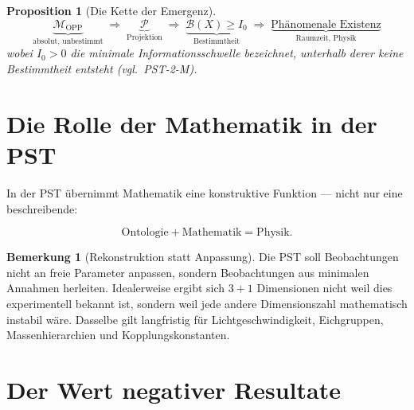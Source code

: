 \documentclass[11pt,a4paper]{article}
\theoremstyle{plain}
\newtheorem{proposition}{Proposition}[section]
\theoremstyle{definition}
\newtheorem{remark}{Bemerkung}[section]
\begin{document}
\begin{proposition}[Die Kette der Emergenz]
\[
  \underbrace{\mathcal{M}_{\text{OPP}}}_{\text{absolut, unbestimmt}}
  \;\Longrightarrow\;
  \underbrace{\mathcal{P}}_{\text{Projektion}}
  \;\Longrightarrow\;
  \underbrace{\mathcal{B}(X) \geq I_0}_{\text{Bestimmtheit}}
  \;\Longrightarrow\;
  \underbrace{\text{Ph\"{a}nomenale Existenz}}_{\text{Raumzeit, Physik}}
\]
wobei $I_0 > 0$ die minimale Informationsschwelle bezeichnet, unterhalb
derer keine Bestimmtheit entsteht (vgl.\ PST-2-M).
\end{proposition}

\section{Die Rolle der Mathematik in der PST}

In der PST \"{u}bernimmt Mathematik eine konstruktive Funktion --- nicht
nur eine beschreibende:

\[
  \boxed{
    \text{Ontologie} + \text{Mathematik} = \text{Physik.}
  }
\]

\begin{remark}[Rekonstruktion statt Anpassung]
Die PST soll Beobachtungen nicht an freie Parameter anpassen, sondern
Beobachtungen aus minimalen Annahmen herleiten. Idealerweise ergibt sich
$3+1$ Dimensionen nicht weil dies experimentell bekannt ist, sondern weil
jede andere Dimensionszahl mathematisch instabil w\"{a}re. Dasselbe gilt
langfristig f\"{u}r Lichtgeschwindigkeit, Eichgruppen,
Massenhierarchien und Kopplungskonstanten.
\end{remark}

\section{Der Wert negativer Resultate}
\end{document}
